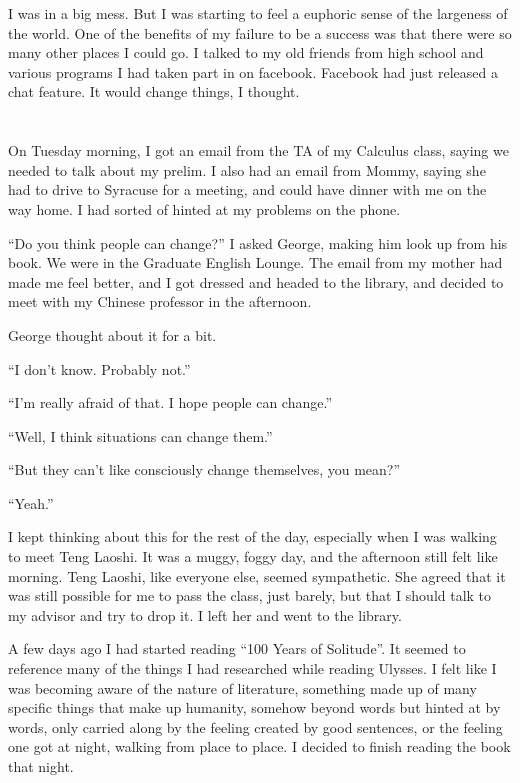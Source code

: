 I was in a big mess.  But I was starting to feel a euphoric sense of the
largeness of the world.  One of the benefits of my failure to be a success was
that there were so many other places I could go.  I talked to my old friends
from high school and various programs I had taken part in on facebook.  Facebook
had just released a chat feature.  It would change things, I thought.

\section{}

On Tuesday morning, I got an email from the TA of my Calculus class, saying we needed to
talk about my prelim.  I also had an email from Mommy, saying she had to drive
to Syracuse for a meeting, and could have dinner with me on the way home.  I had
sorted of hinted at my problems on the phone.  

``Do you think people can change?'' I asked George, making him look up from his
book.  We were in the Graduate English Lounge.  The email from my mother had
made me feel better, and I got dressed and headed to the library, and decided to
meet with my Chinese professor in the afternoon.

George thought about it for a bit.

``I don't know.  Probably not.''

``I'm really afraid of that.  I hope people can change.''

``Well, I think situations can change them.''

``But they can't like consciously change themselves, you mean?''

``Yeah.''

I kept thinking about this for the rest of the day, especially when I was
walking to meet Teng Laoshi.  It was a muggy, foggy day, and the afternoon still
felt like morning.  Teng Laoshi, like everyone else, seemed sympathetic.  She
agreed that it was still possible for me to pass the class, just barely, but
that I should talk to my advisor and try to drop it.  I left her and went to the
library.

A few days ago I had started reading ``100 Years of Solitude''.  It seemed to
reference many of the things I had researched while reading Ulysses.  I felt
like I was becoming aware of the nature of literature, something made up of many
specific things that make up humanity, somehow beyond words but hinted at by
words, only carried along by the feeling created by good sentences, or the
feeling one got at night, walking from place to place.  I decided to finish
reading the book that night.


